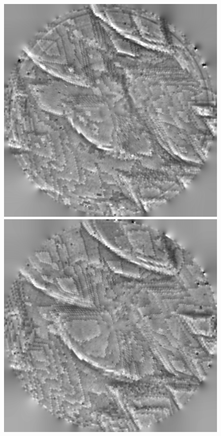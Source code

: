 \begin{figure}[!ht]
\centering
{}
  	\includegraphics[width=\linewidth]{images/006_X10s50l10m_MOv2_17.png}
\endminipage\hfill
{}
  	\includegraphics[width=\linewidth]{images/006_X10s50l10m_MOv2_122.png}

\end{figure}
